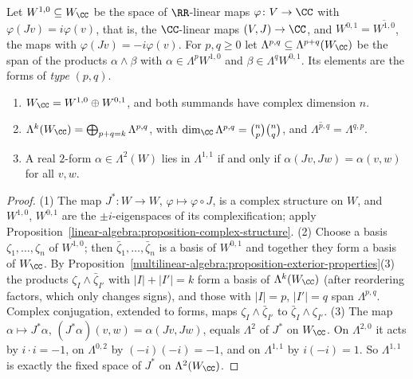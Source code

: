 \begin{definition}\label{multilinear-algebra:definition-pq}
Let $W^{1,0} \subseteq W_\CC$ be the space of $\RR$-linear maps $\varphi \colon V \to \CC$ with $\varphi(Jv) = i\varphi(v)$, that is, the
$\CC$-linear maps $(V, J) \to \CC$, and $W^{0,1} = \overline{W^{1,0}}$, the maps with $\varphi(Jv) = -i\varphi(v)$. For
$p, q \geq 0$ let $\Lambda^{p,q} \subseteq \Lambda^{p+q}(W_\CC)$ be the span of the products $\alpha \wedge \beta$ with
$\alpha \in \Lambda^p W^{1,0}$ and $\beta \in \Lambda^q W^{0,1}$. Its elements are the forms of \emph{type} $(p, q)$.
\end{definition}

\begin{proposition}\label{multilinear-algebra:proposition-pq-decomposition}
\begin{enumerate}
\item $W_\CC = W^{1,0} \oplus W^{0,1}$, and both summands have complex dimension $n$.
\item $\Lambda^k(W_\CC) = \bigoplus_{p+q=k}\Lambda^{p,q}$, with $\dim_\CC \Lambda^{p,q} = \binom{n}{p}\binom{n}{q}$, and
$\overline{\Lambda^{p,q}} = \Lambda^{q,p}$.
\item A real $2$-form $\alpha \in \Lambda^2(W)$ lies in $\Lambda^{1,1}$ if and only if $\alpha(Jv, Jw) = \alpha(v, w)$ for all $v, w$.
\end{enumerate}
\end{proposition}

\begin{proof}
(1) The map $J^* \colon W \to W$, $\varphi \mapsto \varphi \circ J$, is a complex structure on $W$, and $W^{1,0}$, $W^{0,1}$ are the
$\pm i$-eigenspaces of its complexification; apply Proposition~\ref{linear-algebra:proposition-complex-structure}.
(2) Choose a basis $\zeta_1, \ldots, \zeta_n$ of $W^{1,0}$; then $\bar\zeta_1, \ldots, \bar\zeta_n$ is a basis of $W^{0,1}$ and together
they form a basis of $W_\CC$. By Proposition~\ref{multilinear-algebra:proposition-exterior-properties}(3) the products
$\zeta_I \wedge \bar\zeta_{I'}$ with $|I| + |I'| = k$ form a basis of $\Lambda^k(W_\CC)$ (after reordering factors, which only changes
signs), and those with $|I| = p$, $|I'| = q$ span $\Lambda^{p,q}$. Complex conjugation, extended to forms, maps
$\zeta_I \wedge \bar\zeta_{I'}$ to $\bar\zeta_I \wedge \zeta_{I'}$.
(3) The map $\alpha \mapsto J^*\alpha$, $(J^*\alpha)(v, w) = \alpha(Jv, Jw)$, equals $\Lambda^2$ of $J^*$ on $W_\CC$. On $\Lambda^{2,0}$ it acts by
$i \cdot i = -1$, on $\Lambda^{0,2}$ by $(-i)(-i) = -1$, and on $\Lambda^{1,1}$ by $i(-i) = 1$. So $\Lambda^{1,1}$ is exactly the fixed space of
$J^*$ on $\Lambda^2(W_\CC)$.
\end{proof}

